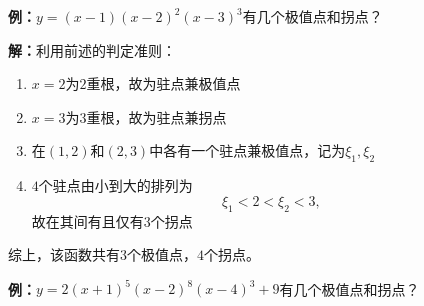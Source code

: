 \begin{shaded}
	{\bf 例：}$y=(x-1)(x-2)^2(x-3)^3$有几个极值点和拐点？
	
	\begin{center}
	\end{center}
	
	{\bf 解：}利用前述的判定准则：
	\begin{enumerate}[(1)]
  	  \setlength{\itemindent}{1cm}
	  \item $x=2$为$2$重根，故为驻点兼极值点
	  \item $x=3$为$3$重根，故为驻点兼拐点
	  \item 在$(1,2)$和$(2,3)$中各有一个驻点兼极值点，记为$\xi_1,\xi_2$
	  \item $4$个驻点由小到大的排列为
	  $$\xi_1<2<\xi_2<3,$$
	  故在其间有且仅有$3$个拐点
	\end{enumerate}
	
	综上，该函数共有$3$个极值点，$4$个拐点。
	
	{\bf 例：}$y=2(x+1)^5(x-2)^8(x-4)^3+9$有几个极值点和拐点？
	
	\begin{center}
	\end{center}
	

\end{shaded}
